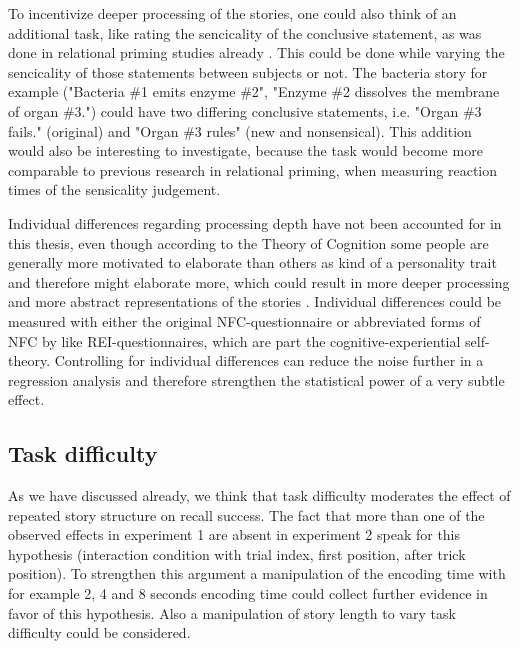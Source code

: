 \documentclass[a4paper,man,natbib,floatsintext,import]{apa6}
\begin{document}
To incentivize deeper processing of the stories, one could also think of an additional task, like rating the sencicality of the conclusive statement, as was done in relational priming studies already \citep{Estes2006,Popov2015}. This could be done while varying the sencicality of those statements between subjects or not. The bacteria story for example ("Bacteria \#1 emits enzyme \#2", "Enzyme \#2 dissolves the membrane of organ \#3.") could have two differing conclusive statements, i.e. "Organ \#3 fails." (original) and "Organ \#3 rules" (new and nonsensical). This addition would also be interesting to investigate, because the task would become more comparable to previous research in relational priming, when measuring reaction times of the sensicality judgement.

Individual differences regarding processing depth have not been accounted for in this thesis, even though according to the Theory of Cognition some people are generally more motivated to elaborate than others as kind of a personality trait and therefore might elaborate more, which could result in more deeper processing and more abstract representations of the stories \citep{Cacioppo1982,Cacioppo1996}. Individual differences could be measured with either the original NFC-questionnaire \citep{Cacioppo1982} or abbreviated forms of NFC by \cite{Epstein1996} like REI-questionnaires, which are part the cognitive-experiential self-theory. Controlling for individual differences can reduce the noise further in a regression analysis and therefore strengthen the statistical power of a very subtle effect.

\subsection{Task difficulty}
As we have discussed already, we think that task difficulty moderates the effect of repeated story structure on recall success. The fact that more than one of the observed effects in experiment 1 are absent in experiment 2  speak for this hypothesis (interaction condition with trial index, first position, after trick position). To strengthen this argument a manipulation of the encoding time with for example 2, 4 and 8 seconds encoding time could collect further evidence in favor of this hypothesis. Also a manipulation of story length to vary task difficulty could be considered.

\newpage
\end{document}
